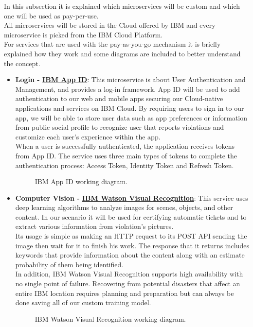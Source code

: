 In this subsection it is explained which microservices will be custom and which one will be used as pay-per-use. 
\\All microservices will be stored in the Cloud offered by IBM and every microservice is picked from the IBM Cloud Platform.
\\For services that are used with the pay-as-you-go mechanism it is briefly explained how they work and some diagrams are included to better understand the concept.
\begin{itemize}
	\item \textbf{Login - \href{https://cloud.ibm.com/catalog/services/app-id}{IBM App ID}}: This microservice is about User Authentication and Management, and provides a log-in framework. App ID will be used to add authentication to our web and mobile apps securing our Cloud-native applications and services on IBM Cloud. By requiring users to sign in to our app, we will be able to store user data such as app preferences or information from public social profile to recognize user that reports violations and customize each user's experience within the app.
	\\When a user is successfully authenticated, the application receives tokens from App ID. The service uses three main types of tokens to complete the authentication process: Access Token, Identity Token and Refresh Token.
	\begin{figure}[h!]
		\caption{IBM App ID working diagram.}
	\end{figure}
	\FloatBarrier

	\item \textbf{Computer Vision - \href{https://cloud.ibm.com/catalog/services/visual-recognition}{IBM Watson Visual Recognition}}: This service uses deep learning algorithms to analyze images for scenes, objects, and other content. In our scenario it will be used for certifying automatic tickets and to extract various information from violation's pictures.
	\\Its usage is simple as making an HTTP request to its POST API sending the image then wait for it to finish his work. The response that it returns includes keywords that provide information about the content along with an estimate probability of them being identified.
	\\In addition, IBM Watson Visual Recognition supports high availability with no single point of failure. Recovering from potential disasters that affect an entire IBM location requires planning and preparation but can always be done saving all of our custom training model.
	\begin{figure}[h!]
		\caption{IBM Watson Visual Recognition working diagram.}
	\end{figure}
	\FloatBarrier
	

\end{itemize}
